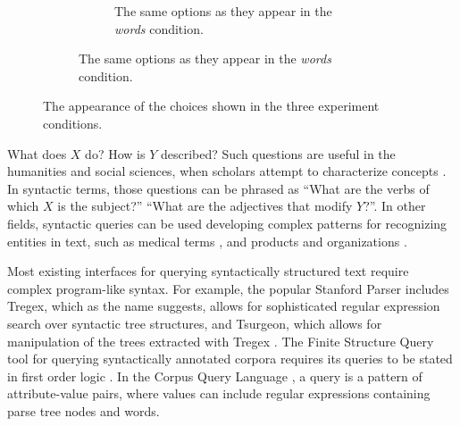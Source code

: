 \begin{figure}[th]
\begin{subfigure}{0.7\columnwidth}
	    \begin{subfigure}{0.7\columnwidth}
	    	\centering
	        \caption {The same options as they appear in the \emph{words} condition. \label{fig:words-choices}}
	    \end{subfigure}
	\end{subfigure}

\caption{\label{fig:choices} The appearance of the choices shown in the three experiment conditions.}
\end{figure}


What does $X$ do? How is $Y$ described? Such questions are useful in the humanities and social sciences, when scholars attempt to characterize concepts \cite{muralidharan2013supporting}. In syntactic terms, those questions can be phrased as ``What are the verbs of which $X$ is the subject?'' ``What are the adjectives that modify $Y$?''. In other fields, syntactic queries can be used  developing complex patterns for recognizing entities in text, such as medical terms \cite{hirschman2005overview,maclean2013identifying}, and  products and organizations \cite{culotta2005reducing}.

Most existing interfaces for querying syntactically structured text require complex program-like syntax. For example, the popular Stanford Parser includes Tregex, which as the name suggests,  allows for sophisticated regular expression search over syntactic tree structures, and Tsurgeon, which allows for manipulation of the trees extracted with Tregex \cite{levy2006tregex}. The Finite Structure Query tool for querying syntactically annotated corpora requires its queries to be stated in first order logic \cite{kepser2003finite}. In the Corpus Query Language \cite{jakubicek2010fast}, a query is a pattern of attribute-value pairs, where values can include regular expressions containing parse tree nodes and words.

